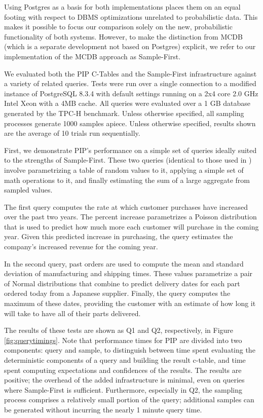 Using Postgres as a basis for both implementations places them on an equal footing with respect to DBMS optimizations unrelated to probabilistic data.  This makes it possible to focus our comparison solely on the new, probabilistic functionality of both systems.  However, to make the distinction from MCDB (which is a separate development not based on Postgres) explicit, we refer to our implementation of the MCDB approach as Sample-First.

We evaluated both the PIP C-Tables and the Sample-First infrastructure against a variety of related queries.  Tests were run over a single connection to a modified instance of PostgreSQL 8.3.4 with default settings running on a 2x4 core 2.0 GHz Intel Xeon with a 4MB cache.  All queries were evaluated over a 1 GB database generated by the TPC-H benchmark.  Unless otherwise specified, all sampling processes generate 1000 samples apiece.  Unless otherwise specified, results shown are the average of 10 trials run sequentially.  



First, we demonstrate PIP's performance on a simple set of queries ideally suited to the strengths of Sample-First.  These two queries (identical to those used in \cite{MCDB}) involve pa\-ra\-me\-tri\-zing a table of random values to it, applying a simple set of math operations to it, and finally estimating the sum of a large aggregate from sampled values.  

The first query computes the rate at which customer purchases have increased over the past two years.  The percent increase parametrizes a Poisson distribution that is used to predict how much more each customer will purchase in the coming year.  Given this predicted increase in purchasing, the query estimates the company's increased revenue for the coming year.

In the second query, past orders are used to compute the mean and standard deviation of manufacturing and shipping times.  These values parametrize a pair of Normal distributions that combine to predict delivery dates for each part ordered today from a Japanese supplier.  Finally, the query computes the maximum of these dates, providing the customer with an estimate of how long it will take to have all of their parts delivered.

The results of these tests are shown as Q1 and Q2, respectively, in Figure \ref{fig:querytimings}.  Note that performance times for PIP are divided into two components: query and sample, to distinguish between time spent evaluating the deterministic components of a query and building the result c-table, and time spent computing expectations and confidences of the results.  The results are positive; the overhead of the added infrastructure is minimal, even on queries where Sample-First is sufficient.  Furthermore, especially in Q2, the sampling process comprises a relatively small portion of the query; additional samples can be generated without incurring the nearly 1 minute query time.

